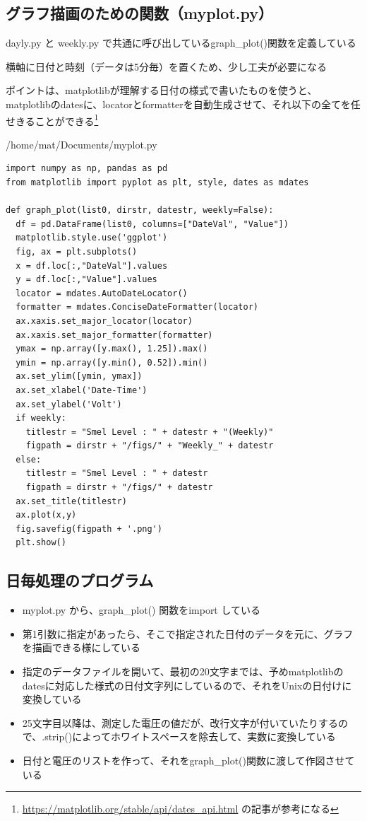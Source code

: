 \documentclass[12pt,a4paper,uplatex]{jsarticle}
\begin{document}
\subsection{グラフ描画のための関数（myplot.py）}

dayly.py と weekly.py で共通に呼び出しているgraph\_plot()関数を定義している

横軸に日付と時刻（データは5分毎）を置くため、少し工夫が必要になる

ポイントは、matplotlibが理解する日付の様式で書いたものを使うと、matplotlibのdatesに、locatorとformatterを自動生成させて、それ以下の全てを任せきることができる\footnote{\url{https://matplotlib.org/stable/api/dates_api.html}
	の記事が参考になる}

\begin{itembox}[l]{/home/mat/Documents/myplot.py}
	\begin{verbatim}
import numpy as np, pandas as pd
from matplotlib import pyplot as plt, style, dates as mdates

def graph_plot(list0, dirstr, datestr, weekly=False):
  df = pd.DataFrame(list0, columns=["DateVal", "Value"])
  matplotlib.style.use('ggplot')
  fig, ax = plt.subplots()
  x = df.loc[:,"DateVal"].values
  y = df.loc[:,"Value"].values
  locator = mdates.AutoDateLocator()
  formatter = mdates.ConciseDateFormatter(locator)
  ax.xaxis.set_major_locator(locator)
  ax.xaxis.set_major_formatter(formatter)
  ymax = np.array([y.max(), 1.25]).max()
  ymin = np.array([y.min(), 0.52]).min()
  ax.set_ylim([ymin, ymax])
  ax.set_xlabel('Date-Time')
  ax.set_ylabel('Volt')
  if weekly:
    titlestr = "Smel Level : " + datestr + "(Weekly)"
    figpath = dirstr + "/figs/" + "Weekly_" + datestr
  else:
    titlestr = "Smel Level : " + datestr
    figpath = dirstr + "/figs/" + datestr
  ax.set_title(titlestr)
  ax.plot(x,y)
  fig.savefig(figpath + '.png')
  plt.show()	
	\end{verbatim}
\end{itembox}

\newpage

\subsection{日毎処理のプログラム}

\begin{itemize}
	\item myplot.py から、graph\_plot() 関数をimport している
	\item 第1引数に指定があったら、そこで指定された日付のデータを元に、グラフを描画できる様にしている
	\item 指定のデータファイルを開いて、最初の20文字までは、予めmatplotlibのdatesに対応した様式の日付文字列にしているので、それをUnixの日付けに変換している
	\item 25文字目以降は、測定した電圧の値だが、改行文字が付いていたりするので、.strip()によってホワイトスペースを除去して、実数に変換している
	\item 日付と電圧のリストを作って、それをgraph\_plot()関数に渡して作図させている
\end{itemize}
\end{document}
